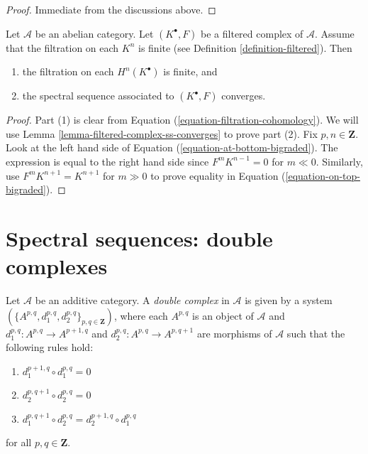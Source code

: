 \begin{proof}
Immediate from the discussions above.
\end{proof}

\begin{lemma}
\label{lemma-biregular-ss-converges}
Let $\mathcal{A}$ be an abelian category.
Let $(K^\bullet, F)$ be a filtered complex of $\mathcal{A}$.
Assume that the filtration on each $K^n$ is finite
(see Definition \ref{definition-filtered}).
Then
\begin{enumerate}
\item the filtration on each $H^n(K^\bullet)$ is finite, and
\item the spectral sequence associated to $(K^\bullet, F)$ converges.
\end{enumerate}
\end{lemma}

\begin{proof}
Part (1) is clear from Equation (\ref{equation-filtration-cohomology}).
We will use Lemma \ref{lemma-filtered-complex-ss-converges} to prove
part (2). Fix $p, n \in \mathbf{Z}$. Look at the left hand side of
Equation (\ref{equation-at-bottom-bigraded}). The expression is
equal to the right hand side since $F^mK^{n - 1} = 0$ for
$m \ll 0$. Similarly, use $F^mK^{n + 1} = K^{n + 1}$ for
$m \gg 0$ to prove equality in Equation (\ref{equation-on-top-bigraded}).
\end{proof}

























\section{Spectral sequences: double complexes}
\label{section-double-complex}

\begin{definition}
\label{definition-double-complex}
Let $\mathcal{A}$ be an additive category.
A {\it double complex} in $\mathcal{A}$ is given
by a system $(\{A^{p, q}, d_1^{p, q}, d_2^{p, q}\}_{p, q\in \mathbf{Z}})$,
where each $A^{p, q}$ is an object of $\mathcal{A}$ and
$d_1^{p, q} : A^{p, q} \to A^{p + 1, q}$ and
$d_2^{p, q} : A^{p, q} \to A^{p, q + 1}$ are morphisms of $\mathcal{A}$
such that the following rules hold:
\begin{enumerate}
\item $d_1^{p + 1, q} \circ d_1^{p, q} = 0$
\item $d_2^{p, q + 1} \circ d_2^{p, q} = 0$
\item $d_1^{p, q + 1} \circ d_2^{p, q} = d_2^{p + 1, q} \circ d_1^{p, q}$
\end{enumerate}
for all $p, q \in \mathbf{Z}$.
\end{definition}

